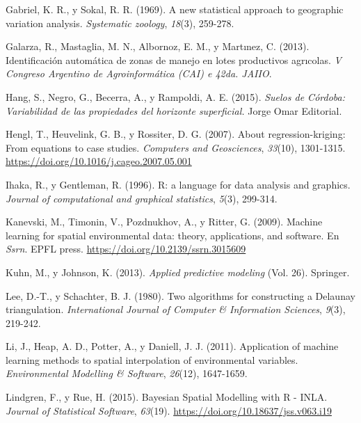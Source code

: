 \documentclass[11pt,b5paper,]{krantz}
\begin{document}
\hypertarget{ref-Gabriel_Sokal_1969}{}
Gabriel, K. R., y Sokal, R. R. (1969). A new statistical approach to
geographic variation analysis. \emph{Systematic zoology}, \emph{18}(3),
259-278.

\hypertarget{ref-Galarza_Mastaglia_Albornoz_Martux131nez_2013}{}
Galarza, R., Mastaglia, M. N., Albornoz, E. M., y Martınez, C. (2013).
Identificación automática de zonas de manejo en lotes productivos
agrıcolas. \emph{V Congreso Argentino de Agroinformática (CAI) e 42da.
JAIIO}.

\hypertarget{ref-Hang2015}{}
Hang, S., Negro, G., Becerra, A., y Rampoldi, A. E. (2015). \emph{Suelos
de Córdoba: Variabilidad de las propiedades del horizonte superficial.}
Jorge Omar Editorial.

\hypertarget{ref-Hengl_Heuvelink_Rossiter_2007}{}
Hengl, T., Heuvelink, G. B., y Rossiter, D. G. (2007). About
regression-kriging: From equations to case studies. \emph{Computers and
Geosciences}, \emph{33}(10), 1301-1315.
\url{https://doi.org/10.1016/j.cageo.2007.05.001}

\hypertarget{ref-Ihaka_Gentleman_1996}{}
Ihaka, R., y Gentleman, R. (1996). R: a language for data analysis and
graphics. \emph{Journal of computational and graphical statistics},
\emph{5}(3), 299-314.

\hypertarget{ref-Kanevski_Timonin_Pozdnukhov_Ritter_2009}{}
Kanevski, M., Timonin, V., Pozdnukhov, A., y Ritter, G. (2009). Machine
learning for spatial environmental data: theory, applications, and
software. En \emph{Ssrn}. EPFL press.
\url{https://doi.org/10.2139/ssrn.3015609}

\hypertarget{ref-Kuhn_Johnson_2013}{}
Kuhn, M., y Johnson, K. (2013). \emph{Applied predictive modeling} (Vol.
26). Springer.

\hypertarget{ref-Lee_Schachter_1980}{}
Lee, D.-T., y Schachter, B. J. (1980). Two algorithms for constructing a
Delaunay triangulation. \emph{International Journal of Computer \&
Information Sciences}, \emph{9}(3), 219-242.

\hypertarget{ref-Li_Heap_Potter_Daniell_2011}{}
Li, J., Heap, A. D., Potter, A., y Daniell, J. J. (2011). Application of
machine learning methods to spatial interpolation of environmental
variables. \emph{Environmental Modelling \& Software}, \emph{26}(12),
1647-1659.

\hypertarget{ref-Lindgren_Rue_2015}{}
Lindgren, F., y Rue, H. (2015). Bayesian Spatial Modelling with R -
INLA. \emph{Journal of Statistical Software}, \emph{63}(19).
\url{https://doi.org/10.18637/jss.v063.i19}
\end{document}
